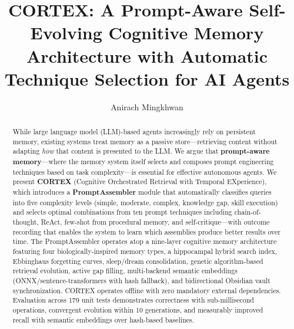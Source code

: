 \documentclass[runningheads]{llncs}
\begin{document}
\title{CORTEX: A Prompt-Aware Self-Evolving Cognitive Memory Architecture with Automatic Technique Selection for AI Agents}

\author{Anirach Mingkhwan}



\maketitle

\begin{abstract}
While large language model (LLM)-based agents increasingly rely on persistent memory, existing systems treat memory as a passive store---retrieving content without adapting \textit{how} that content is presented to the LLM. We argue that \textbf{prompt-aware memory}---where the memory system itself selects and composes prompt engineering techniques based on task complexity---is essential for effective autonomous agents. We present \textbf{CORTEX} (Cognitive Orchestrated Retrieval with Temporal EXperience), which introduces a \textbf{PromptAssembler} module that automatically classifies queries into five complexity levels (simple, moderate, complex, knowledge gap, skill execution) and selects optimal combinations from ten prompt techniques including chain-of-thought, ReAct, few-shot from procedural memory, and self-critique---with outcome recording that enables the system to learn which assemblies produce better results over time. The PromptAssembler operates atop a nine-layer cognitive memory architecture featuring four biologically-inspired memory types, a hippocampal hybrid search index, Ebbinghaus forgetting curves, sleep/dream consolidation, genetic algorithm-based retrieval evolution, active gap filling, multi-backend semantic embeddings (ONNX/sentence-transformers with hash fallback), and bidirectional Obsidian vault synchronization. CORTEX operates offline with zero mandatory external dependencies. Evaluation across 179 unit tests demonstrates correctness with sub-millisecond operations, convergent evolution within 10 generations, and measurably improved recall with semantic embeddings over hash-based baselines.

\end{abstract}
\end{document}
